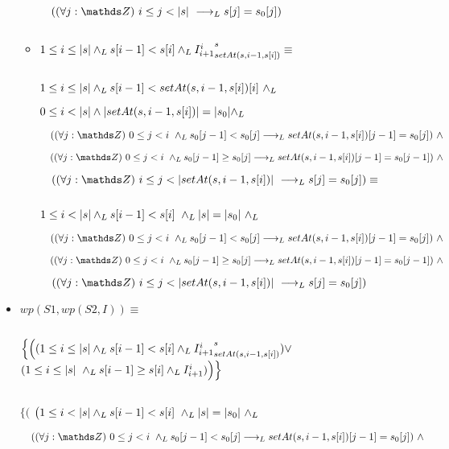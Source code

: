 \documentclass{article}
\begin{document}
\begin{itemize}
\begin{itemize}
        $\quad (\paraTodo{j}{i}{\longitud{s}} \implicaLuego s[j] = s_0[j])$

        $ $

        \item $1 \leq i \leq |s| \land _L s[i-1] < s[i] \land _L {I_{i+1}^{i}}_{setAt(s,i-1, s[i])}^{s} \equiv$

        $ $

        $ 1 \leq i \leq |s| \land _L s[i-1] < setAt(s,i-1, s[i])[i]\ \land _L $

        $ 0 \leq i < |s| \wedge |setAt(s,i-1, s[i])| = |s_0| \land _L$

        $ \quad (\paraTodo{j}{0}{i} \yLuego s_0[j-1] < s_0[j] \implicaLuego setAt(s,i-1, s[i])[j-1] = s_0[j])\ \wedge $

        $ \quad (\paraTodo{j}{0}{i} \yLuego s_0[j-1] \geq s_0[j] \implicaLuego setAt(s,i-1, s[i])[j-1] = s_0[j-1])\ \wedge$

        $ \quad (\paraTodo{j}{i}{\longitud{setAt(s,i-1, s[i])}} \implicaLuego s[j] = s_0[j]) \equiv$

        $ $

        $ 1 \leq i < |s| \land _L s[i-1] < s[i]\ \land _L |s| = |s_0|\ \land _L $

        $ \quad (\paraTodo{j}{0}{i} \yLuego s_0[j-1] < s_0[j] \implicaLuego setAt(s,i-1, s[i])[j-1] = s_0[j])\ \wedge $

        $ \quad (\paraTodo{j}{0}{i} \yLuego s_0[j-1] \geq s_0[j] \implicaLuego setAt(s,i-1, s[i])[j-1] = s_0[j-1])\ \wedge$

        $ \quad (\paraTodo{j}{i}{\longitud{setAt(s,i-1, s[i])}} \implicaLuego s[j] = s_0[j]) $

    \end{itemize} %

    \item $wp(S1, wp(S2, I)) \equiv$

    $ $

    $ \Big\{ \Big((1 \leq i \leq |s| \land _L s[i-1] < s[i] \land _L {I_{i+1}^{i}}_{setAt(s,i-1, s[i])}^{s}) \vee $
    $ (1 \leq i \leq \longitud{s}\ \yLuego s[i-1] \geq s[i] \yLuego I_{i+1}^{i}) \Big) \Big\} $

    $ $

    $ \Big\{ \Big( $
    $ \big(1 \leq i < \longitud{s} \yLuego s[i-1] < s[i]\ \yLuego \longitud{s} = \longitud{s_0}\ \yLuego $

    $ \quad (\paraTodo{j}{0}{i} \yLuego s_0[j-1] < s_0[j] \implicaLuego setAt(s,i-1, s[i])[j-1] = s_0[j])\ \wedge $


\end{itemize}
\end{document}
